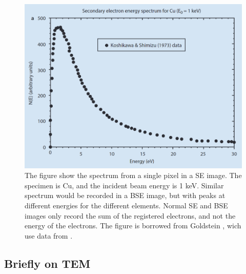 \begin{figure}[ht]
    \centering
    \includegraphics[width=0.8\linewidth]{figures/SEM_SE_spectrums.png}
    \caption{
        The figure show the spectrum from a single pixel in a SE image.
        The specimen is Cu, and the incident beam energy is 1 keV.
        Similar spectrum would be recorded in a BSE image, but with peaks at different energies for the different elements.
        Normal SE and BSE images only record the sum of the registered electrons, and not the energy of the electrons.
        The figure is borrowed from Goldstein \cite[Fig. 3.1 a]{goldstein_scanning_2018}, wich use data from \cite{koshikawa_SE_spectrum_1973}.
    }
    \label{fig:SEM_SE_spectrums}
\end{figure}


\subsection{Briefly on TEM}
\label{theory:sem:tem}

